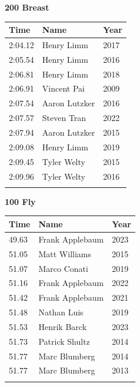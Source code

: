 \vspace{1.2em}
\noindent\begin{minipage}[t]{0.48\textwidth}
\centering
\textbf{\textcolor{teamprimary}{200 Breast}}\par
\vspace{0.5em}
\centering
\small
\renewcommand{\arraystretch}{1.0}
\setlength{\tabcolsep}{4pt}
\begin{tabular}{@{}p{1.8cm}p{3.0cm}p{1.0cm}@{}}
\toprule
\textbf{Time} & \textbf{Name} & \textbf{Year} \\
\midrule
2:04.12 & Henry Limm & 2017 \\
2:05.54 & Henry Limm & 2016 \\
2:06.81 & Henry Limm & 2018 \\
2:06.91 & Vincent Pai & 2009 \\
2:07.54 & Aaron Lutzker & 2016 \\
2:07.57 & Steven Tran & 2022 \\
2:07.94 & Aaron Lutzker & 2015 \\
2:09.08 & Henry Limm & 2019 \\
2:09.45 & Tyler Welty & 2015 \\
2:09.96 & Tyler Welty & 2016 \\
\bottomrule
\vspace{0.5em}
\end{tabular}
\end{minipage}
\hfill
\begin{minipage}[t]{0.48\textwidth}
\centering
\textbf{\textcolor{teamprimary}{100 Fly}}\par
\vspace{0.5em}
\centering
\small
\renewcommand{\arraystretch}{1.0}
\setlength{\tabcolsep}{4pt}
\begin{tabular}{@{}p{1.8cm}p{3.0cm}p{1.0cm}@{}}
\toprule
\textbf{Time} & \textbf{Name} & \textbf{Year} \\
\midrule
49.63 & Frank Applebaum & 2023 \\
51.05 & Matt Williams & 2015 \\
51.07 & Marco Conati & 2019 \\
51.16 & Frank Applebaum & 2022 \\
51.42 & Frank Applebaum & 2021 \\
51.48 & Nathan Luis & 2019 \\
51.53 & Henrik Barck & 2023 \\
51.73 & Patrick Shultz & 2014 \\
51.77 & Marc Blumberg & 2014 \\
51.77 & Marc Blumberg & 2013 \\
\bottomrule
\vspace{0.5em}
\end{tabular}
\end{minipage}
